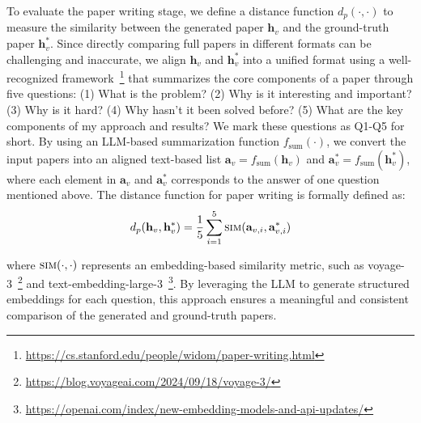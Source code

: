  To evaluate the paper writing stage, we define a distance function $ d_p(\cdot, \cdot) $ to measure the similarity between the generated paper $ \mathbf{h}_v $ and the ground-truth paper $ \mathbf{h}_v^* $. Since directly comparing full papers in different formats can be challenging and inaccurate, we align $ \mathbf{h}_v $ and $ \mathbf{h}_v^* $ into a unified format using a well-recognized framework~\footnote{\url{https://cs.stanford.edu/people/widom/paper-writing.html}} that summarizes the core components of a paper through five questions: (1) What is the problem? (2) Why is it interesting and important? (3) Why is it hard? (4) Why hasn't it been solved before? (5) What are the key components of my approach and results? We mark these questions as Q1-Q5 for short. By using an LLM-based summarization function $ f_\text{sum}(\cdot) $, we convert the input papers into an aligned text-based list $ \mathbf{a}_v = f_\text{sum}(\mathbf{h}_v) $ and $ \mathbf{a}^*_v = f_\text{sum}(\mathbf{h}^*_v) $, where each element in $ \mathbf{a}_v $ and $ \mathbf{a}_v^* $ corresponds to the answer of one question mentioned above. The distance function for paper writing is formally defined as:
\begin{align}
\vspace{-1mm}
d_p(\mathbf{h}_v, \mathbf{h}^*_v) = \frac{1}{5} \sum_{i=1}^{5} \textsc{sim}(\mathbf{a}_{v,i}, \mathbf{a}^*_{v,i})
\label{paper-score}
\vspace{-1mm}
\end{align}

where $ \textsc{sim}(\cdot, \cdot) $ represents an embedding-based similarity metric, such as voyage-3~\footnote{\url{https://blog.voyageai.com/2024/09/18/voyage-3/}} and text-embedding-large-3~\footnote{\url{https://openai.com/index/new-embedding-models-and-api-updates/}}. By leveraging the LLM to generate structured embeddings for each question, this approach ensures a meaningful and consistent comparison of the generated and ground-truth papers.

